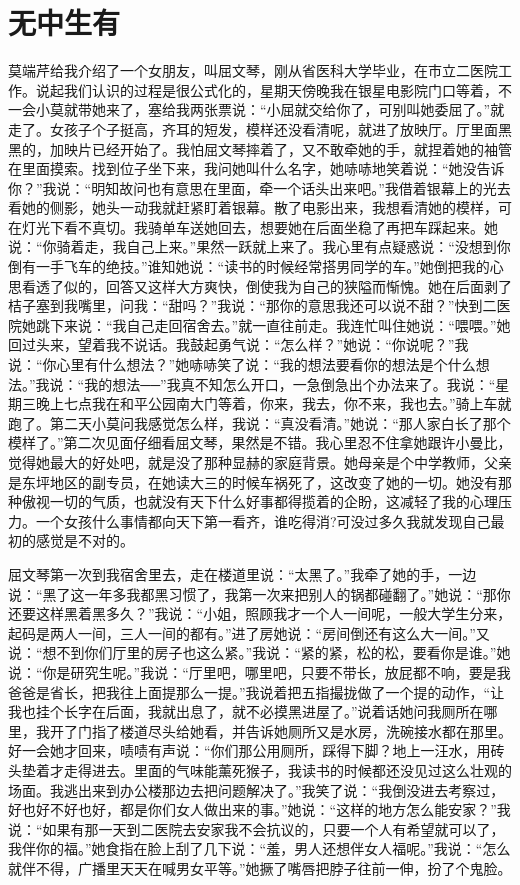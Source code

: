 \documentclass[12pt,oneside]{book}
\begin{document}
\chapter{无中生有}
莫端芹给我介绍了一个女朋友，叫屈文琴，刚从省医科大学毕业，在市立二医院工作。说起我们认识的过程是很公式化的，星期天傍晚我在银星电影院门口等着，不一会小莫就带她来了，塞给我两张票说：``小屈就交给你了，可别叫她委屈了。''就走了。女孩子个子挺高，齐耳的短发，模样还没看清呢，就进了放映厅。厅里面黑黑的，加映片已经开始了。我怕屈文琴摔着了，又不敢牵她的手，就捏着她的袖管在里面摸索。找到位子坐下来，我问她叫什么名字，她哧哧地笑着说：``她没告诉你？''我说：``明知故问也有意思在里面，牵一个话头出来吧。''我借着银幕上的光去看她的侧影，她头一动我就赶紧盯着银幕。散了电影出来，我想看清她的模样，可在灯光下看不真切。我骑单车送她回去，想要她在后面坐稳了再把车踩起来。她说：``你骑着走，我自己上来。''果然一跃就上来了。我心里有点疑惑说：``没想到你倒有一手飞车的绝技。''谁知她说：``读书的时候经常搭男同学的车。''她倒把我的心思看透了似的，回答又这样大方爽快，倒使我为自己的狭隘而惭愧。她在后面剥了桔子塞到我嘴里，问我：``甜吗？''我说：``那你的意思我还可以说不甜？''快到二医院她跳下来说：``我自己走回宿舍去。''就一直往前走。我连忙叫住她说：``喂喂。''她回过头来，望着我不说话。我鼓起勇气说：``怎么样？''她说：``你说呢？''我说：``你心里有什么想法？''她哧哧笑了说：``我的想法要看你的想法是个什么想法。''我说：``我的想法──''我真不知怎么开口，一急倒急出个办法来了。我说：``星期三晚上七点我在和平公园南大门等着，你来，我去，你不来，我也去。''骑上车就跑了。第二天小莫问我感觉怎么样，我说：``真没看清。''她说：``那人家白长了那个模样了。''第二次见面仔细看屈文琴，果然是不错。我心里忍不住拿她跟许小曼比，觉得她最大的好处吧，就是没了那种显赫的家庭背景。她母亲是个中学教师，父亲是东坪地区的副专员，在她读大三的时候车祸死了，这改变了她的一切。她没有那种傲视一切的气质，也就没有天下什么好事都得揽着的企盼，这减轻了我的心理压力。一个女孩什么事情都向天下第一看齐，谁吃得消?可没过多久我就发现自己最初的感觉是不对的。

屈文琴第一次到我宿舍里去，走在楼道里说：``太黑了。''我牵了她的手，一边说：``黑了这一年多我都黑习惯了，我第一次来把别人的锅都碰翻了。''她说：``那你还要这样黑着黑多久？''我说：``小姐，照顾我才一个人一间呢，一般大学生分来，起码是两人一间，三人一间的都有。''进了房她说：``房间倒还有这么大一间。''又说：``想不到你们厅里的房子也这么紧。''我说：``紧的紧，松的松，要看你是谁。''她说：``你是研究生呢。''我说：``厅里吧，哪里吧，只要不带长，放屁都不响，要是我爸爸是省长，把我往上面提那么一提。''我说着把五指撮拢做了一个提的动作，``让我也挂个长字在后面，我就出息了，就不必摸黑进屋了。''说着话她问我厕所在哪里，我开了门指了楼道尽头给她看，并告诉她厕所又是水房，洗碗接水都在那里。好一会她才回来，啧啧有声说：``你们那公用厕所，踩得下脚？地上一汪水，用砖头垫着才走得进去。里面的气味能薰死猴子，我读书的时候都还没见过这么壮观的场面。我逃出来到办公楼那边去把问题解决了。''我笑了说：``我倒没进去考察过，好也好不好也好，都是你们女人做出来的事。''她说：``这样的地方怎么能安家？''我说：``如果有那一天到二医院去安家我不会抗议的，只要一个人有希望就可以了，我伴你的福。''她食指在脸上刮了几下说：``羞，男人还想伴女人福呢。''我说：``怎么就伴不得，广播里天天在喊男女平等。''她撅了嘴唇把脖子往前一伸，扮了个鬼脸。
\end{document}
